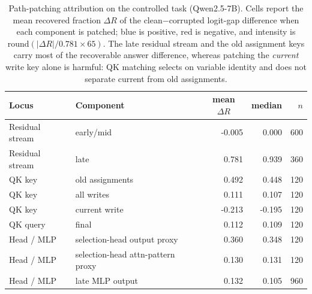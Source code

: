\begin{table}[htbp]
\centering
\footnotesize
\setlength{\tabcolsep}{5pt}
\caption{Path-patching attribution on the controlled task (Qwen2.5-7B). Cells report the mean
recovered fraction $\Delta R$ of the clean$-$corrupted logit-gap difference when each component
is patched; blue is positive, red is negative, and intensity is
$\mathrm{round}(|\Delta R|/0.781\times 65)$. The late residual stream and the old assignment
keys carry most of the recoverable answer difference, whereas patching the \emph{current} write
key alone is harmful: QK matching selects on variable identity and does not separate current from
old assignments.}
\label{tab:patch-attribution}
\begin{tabular}{llrrr}
\toprule
Locus & Component & \multicolumn{1}{c}{mean $\Delta R$} & median & $n$ \\
\midrule
Residual stream & early/mid            &                      -0.005 &  0.000 & 600 \\
Residual stream & late                 & \cellcolor{blue!65}   0.781 &  0.939 & 360 \\
\midrule
QK key          & old assignments      & \cellcolor{blue!41}   0.492 &  0.448 & 120 \\
QK key          & all writes           & \cellcolor{blue!9}    0.111 &  0.107 & 120 \\
QK key          & current write        & \cellcolor{red!18}   -0.213 & -0.195 & 120 \\
QK query        & final                & \cellcolor{blue!9}    0.112 &  0.109 & 120 \\
\midrule
Head / MLP      & selection-head output proxy       & \cellcolor{blue!30} 0.360 & 0.348 & 120 \\
Head / MLP      & selection-head attn-pattern proxy & \cellcolor{blue!11} 0.130 & 0.131 & 120 \\
Head / MLP      & late MLP output                   & \cellcolor{blue!11} 0.132 & 0.105 & 960 \\
\bottomrule
\end{tabular}
\end{table}
